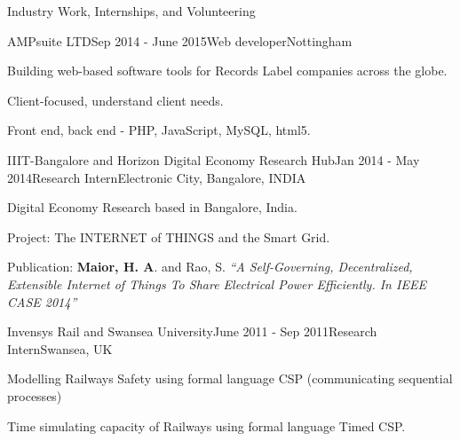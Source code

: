 \documentclass{resume} %
\begin{document}
\begin{rSection}{Industry Work, Internships, and Volunteering}

  \begin{rSubsection}{AMPsuite LTD}{Sep 2014 - June 2015}{Web developer}{Nottingham}
        \item Building web-based software tools for Records Label companies across the globe.
        \item Client-focused, understand client needs.
        \item Front end, back end - PHP, JavaScript, MySQL, html5.
    \end{rSubsection}

	\begin{rSubsection}{IIIT-Bangalore and Horizon Digital Economy Research Hub}{Jan 2014 - May 2014}{Research Intern}{Electronic City, Bangalore, INDIA}
	\item Digital Economy Research based in Bangalore, India.
	\item Project: The INTERNET of THINGS and the Smart Grid.
	\item Publication: \textbf{Maior, H. A}. and Rao, S.  \emph{``A Self-Governing, Decentralized, Extensible Internet of Things To Share Electrical Power Efficiently. In IEEE CASE 2014''}
\end{rSubsection}
	
\begin{rSubsection}{Invensys Rail and Swansea University}{June 2011 - Sep 2011}{Research Intern}{Swansea, UK}
	\item Modelling Railways Safety using formal language CSP (communicating sequential processes)
	\item Time simulating capacity of Railways using formal language Timed CSP.
\end{rSubsection}

\end{rSection}
\end{document}
